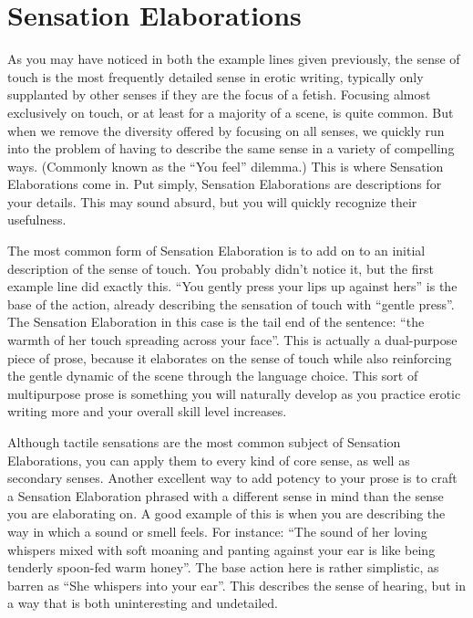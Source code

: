 \documentclass[Source-main.tex]{subfiles}
\begin{document}
\section{Sensation Elaborations}

As you may have noticed in both the example lines given previously, the sense of touch is the most frequently detailed sense in erotic writing, typically only supplanted by other senses if they are the focus of a fetish.
Focusing almost exclusively on touch, or at least for a majority of a scene, is quite common.
But when we remove the diversity offered by focusing on all senses, we quickly run into the problem of having to describe the same sense in a variety of compelling ways.
(Commonly known as the “You feel” dilemma.)
This is where Sensation Elaborations come in.
Put simply, Sensation Elaborations are descriptions for your details.
This may sound absurd, but you will quickly recognize their usefulness.

The most common form of Sensation Elaboration is to add on to an initial description of the sense of touch.
You probably didn’t notice it, but the first example line did exactly this.
“You gently press your lips up against hers” is the base of the action, already describing the sensation of touch with “gentle press”.
The Sensation Elaboration in this case is the tail end of the sentence: “the warmth of her touch spreading across your face”.
This is actually a dual-purpose piece of prose, because it elaborates on the sense of touch while also reinforcing the gentle dynamic of the scene through the language choice.
This sort of multipurpose prose is something you will naturally develop as you practice erotic writing more and your overall skill level increases.

Although tactile sensations are the most common subject of Sensation Elaborations, you can apply them to every kind of core sense, as well as secondary senses.
Another excellent way to add potency to your prose is to craft a Sensation Elaboration phrased with a different sense in mind than the sense you are elaborating on.
A good example of this is when you are describing the way in which a sound or smell feels.
For instance: “The sound of her loving whispers mixed with soft moaning and panting against your ear is like being tenderly spoon-fed warm honey”.
The base action here is rather simplistic, as barren as “She whispers into your ear”.
This describes the sense of hearing, but in a way that is both uninteresting and undetailed.
\end{document}
